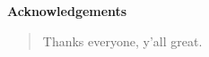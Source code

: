 \clearpage
\vspace*{1.4in}
\begin{center}
  {\textbf{Acknowledgements}} \\
\end{center}
\begin{quotation}
  Thanks everyone, y'all great.
\end{quotation}